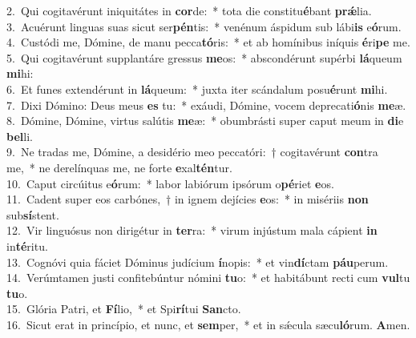 {2.~}Qui cogitavérunt iniquitátes in \textbf{cor}de:~* tota die constitu\textbf{é}bant \textbf{prǽ}lia.\\
{3.~}Acuérunt linguas suas sicut ser\textbf{pén}tis:~* venénum áspidum sub lábi\textbf{is} e\textbf{ó}rum.\\
{4.~}Custódi me, Dómine, de manu pecca\textbf{tó}ris:~* et ab homínibus iníquis \textbf{é}ri\textbf{pe} me.\\
{5.~}Qui cogitavérunt supplantáre gressus \textbf{me}os:~* abscondérunt supérbi \textbf{lá}queum \textbf{mi}hi:\\
{6.~}Et funes extendérunt in \textbf{lá}queum:~* juxta iter scándalum posu\textbf{é}runt \textbf{mi}hi.\\
{7.~}Dixi Dómino: Deus meus \textbf{es} tu:~* exáudi, Dómine, vocem deprecati\textbf{ó}nis \textbf{me}æ.\\
{8.~}Dómine, Dómine, virtus salútis \textbf{me}æ:~* obumbrásti super caput meum in \textbf{di}e \textbf{bel}li.\\
{9.~}Ne tradas me, Dómine, a desidério meo peccatóri:~† cogitavérunt \textbf{con}tra me,~* ne derelínquas me, ne forte \textbf{e}xal\textbf{tén}tur.\\
{10.~}Caput circúitus e\textbf{ó}rum:~* labor labiórum ipsórum o\textbf{pé}riet \textbf{e}os.\\
{11.~}Cadent super eos carbónes,~† in ignem dejícies \textbf{e}os:~* in misériis \textbf{non} sub\textbf{sí}stent.\\
{12.~}Vir linguósus non dirigétur in \textbf{ter}ra:~* virum injústum mala cápient \textbf{in} in\textbf{té}ritu.\\
{13.~}Cognóvi quia fáciet Dóminus judícium \textbf{í}nopis:~* et vin\textbf{dí}ctam \textbf{páu}perum.\\
{14.~}Verúmtamen justi confitebúntur nómini \textbf{tu}o:~* et habitábunt recti cum \textbf{vul}tu \textbf{tu}o.\\
{15.~}Glória Patri, et \textbf{Fí}lio,~* et Spi\textbf{rí}tui \textbf{San}cto.\\
{16.~}Sicut erat in princípio, et nunc, et \textbf{sem}per,~* et in sǽcula sæcu\textbf{ló}rum. \textbf{A}men.\\
